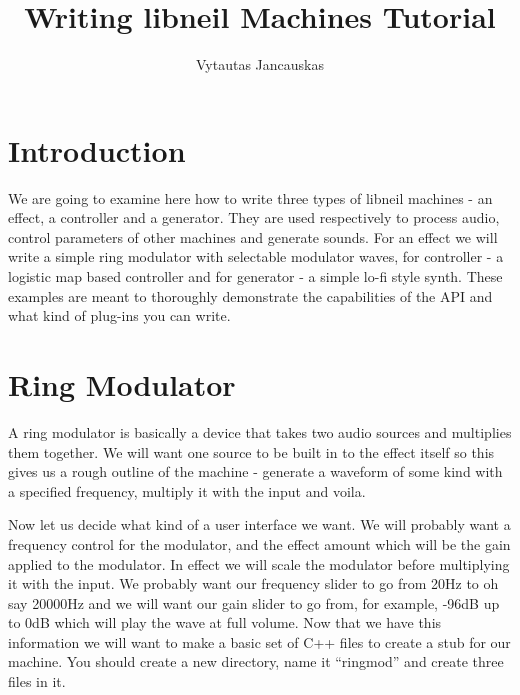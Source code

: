 
\title{Writing libneil Machines Tutorial}
\author{Vytautas Jancauskas}
\maketitle

\section{Introduction}
We are going to examine here how to write three types of libneil machines - an
effect, a controller and a generator. They are used respectively to
process audio, control parameters of other machines and generate
sounds. For an effect we will write a simple ring modulator with
selectable modulator waves, for controller - a logistic map based
controller and for generator - a simple lo-fi style synth. These
examples are meant to thoroughly demonstrate the capabilities of the
API and what kind of plug-ins you can write.

\section{Ring Modulator}

A ring modulator is basically a device that takes two audio sources
and multiplies them together. We will want one source to be built in
to the effect itself so this gives us a rough outline of the machine -
generate a waveform of some kind with a specified frequency, multiply
it with the input and voila.

Now let us decide what kind of a user interface we want. We will
probably want a frequency control for the modulator, and the effect
amount which will be the gain applied to the modulator. In effect we
will scale the modulator before multiplying it with the input. We
probably want our frequency slider to go from 20Hz to oh say 20000Hz
and we will want our gain slider to go from, for example, -96dB up to
0dB which will play the wave at full volume. Now that we have this
information we will want to make a basic set of C++ files to create a
stub for our machine. You should create a new directory, name it
``ringmod'' and create three files in it.

